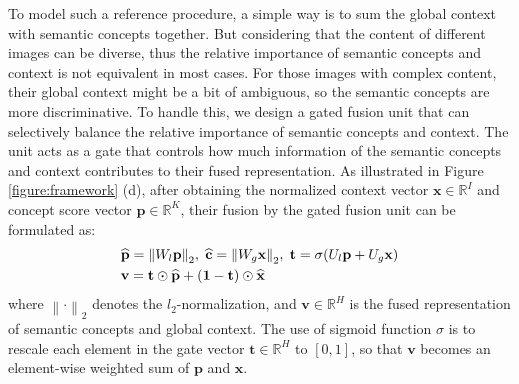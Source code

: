 \documentclass[10pt,twocolumn,letterpaper]{article}
\begin{document}
To model such a reference procedure,
a simple way is to sum the global context with semantic concepts together.
But considering that the content of different images can be diverse,
thus the relative importance of semantic concepts and context
is not equivalent in most cases.
For those images with complex content,
their global context might be a bit of ambiguous,
so the semantic concepts are more discriminative.
To handle this, we design a gated fusion unit that can selectively balance
the relative importance of semantic concepts and context.
The unit acts as a gate that controls how much information of the
semantic concepts and context contributes to their fused representation.
As illustrated in Figure \ref{figure:framework} (d),
after obtaining the normalized context vector $\textbf{x} \in {\mathbb{R}^{I}}$
and concept score vector $\textbf{p} \in {\mathbb{R}^{K}}$,
their fusion by the gated fusion unit can be
formulated as:
\begin{equation} \label{eqn:e3}
\setlength{\abovedisplayskip}{5pt}
\setlength{\belowdisplayskip}{5pt}
\begin{aligned}
& \widehat {\textbf{p}} = {\left\| {{W_l}\textbf{p}} \right\|_2},{\kern 3pt} \widehat {\textbf{c}} = {\left\| {{W_g}\textbf{x}} \right\|_2}
, {\kern 3pt} \textbf{t} = \sigma ({U_l}\textbf{p} + {U_g}\textbf{x})\\
& \textbf{v} = \textbf{t} \odot \widehat {\textbf{p}} + (\textbf{1} - \textbf{t}) \odot \widehat {\textbf{x}}\\
\end{aligned}
\end{equation}
where ${\left\| \cdot \right\|_2}$ denotes the $l_2$-normalization,
and $\textbf{v}\in {\mathbb{R}^{H}}$ is the fused representation of semantic concepts and global context.
The use of sigmoid function $\sigma$ is to rescale each element in the gate vector $\textbf{t}\in {\mathbb{R}^{H}}$ to $[0,1]$,
so that $\textbf{v}$ becomes an element-wise weighted sum of
$\textbf{p}$ and $\textbf{x}$.


\vspace{-3mm}
\end{document}
